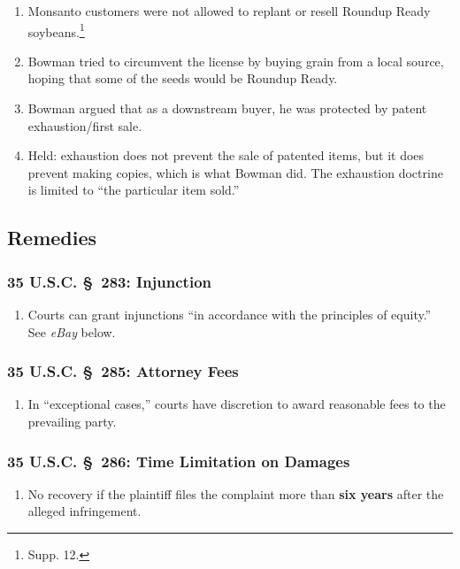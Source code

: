 \begin{enumerate}
    \item Monsanto customers were not allowed to replant or resell Roundup 
    Ready soybeans.\footnote{Supp. 12.}
    \item Bowman tried to circumvent the license by buying grain from a local 
    source, hoping that some of the seeds would be Roundup Ready.
    \item Bowman argued that as a downstream buyer, he was protected by patent 
    exhaustion/first sale.
    \item Held: exhaustion does not prevent the sale of patented items, but it 
    does prevent making copies, which is what Bowman did. The exhaustion 
    doctrine is limited to ``the particular item sold.''
\end{enumerate}

\subsection{Remedies}

\subsubsection{35 U.S.C. \S\ 283: Injunction}

\begin{enumerate}
    \item Courts can grant injunctions ``in accordance with the principles of 
    equity.'' See \emph{eBay} below.
\end{enumerate}

\subsubsection{35 U.S.C. \S\ 285: Attorney Fees}

\begin{enumerate}
    \item In ``exceptional cases,'' courts have discretion to award reasonable 
    fees to the prevailing party.
\end{enumerate}

\subsubsection{35 U.S.C. \S\ 286: Time Limitation on Damages}

\begin{enumerate}
    \item No recovery if the plaintiff files the complaint more than 
    \textbf{six years} after the alleged infringement.
\end{enumerate}

